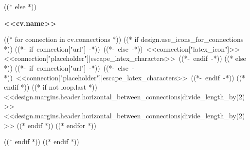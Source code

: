         \vspace{10pt}
    ((* else *))
        \begin{header}
            \textbf{\fontsize{<<design.header_font_size>>}{<<design.header_font_size>>}\selectfont <<cv.name>>}

            \vspace{<<design.margins.header.vertical_between_name_and_connections>>}

            \normalsize
            ((* for connection in cv.connections *))
                ((* if design.use_icons_for_connections *))
            \mbox{((*- if connection["url"] -*))
                ((*- else -*))
                {\color{black}\footnotesize<<connection["latex_icon"]>>}\hspace*{0.13cm}<<connection["placeholder"]|escape_latex_characters>>
                ((*- endif -*))}%
                ((* else *))
            \mbox{((*- if connection["url"] -*))
                ((*- else -*))
                <<connection["placeholder"]|escape_latex_characters>>
                ((*- endif -*))}%
                ((* endif *))
                ((* if not loop.last *))
            \kern <<design.margins.header.horizontal_between_connections|divide_length_by(2)>>%
            \AND%
            \kern <<design.margins.header.horizontal_between_connections|divide_length_by(2)>>%
                ((* endif *))
            ((* endfor *))
        \end{header}
    ((* endif *))
\vspace{<<design.margins.header.bottom>> - <<design.margins.section_title.top>>}
((* endif *))
